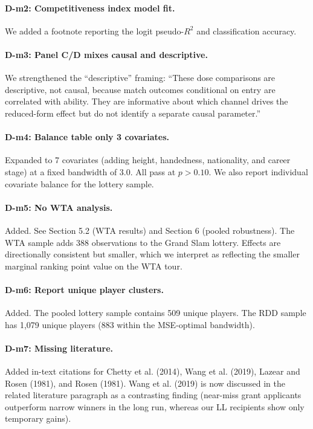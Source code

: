 \documentclass[12pt]{article}
\newcommand{\resp}[1]{\textcolor{response}{#1}}
\begin{document}
\paragraph{D-m2: Competitiveness index model fit.}
\resp{We added a footnote reporting the logit pseudo-$R^2$ and classification accuracy.}

\paragraph{D-m3: Panel C/D mixes causal and descriptive.}
\resp{We strengthened the ``descriptive'' framing: ``These dose comparisons are descriptive, not causal, because match outcomes conditional on entry are correlated with ability. They are informative about which channel drives the reduced-form effect but do not identify a separate causal parameter.''}

\paragraph{D-m4: Balance table only 3 covariates.}
\resp{Expanded to 7 covariates (adding height, handedness, nationality, and career stage) at a fixed bandwidth of 3.0. All pass at $p > 0.10$. We also report individual covariate balance for the lottery sample.}

\paragraph{D-m5: No WTA analysis.}
\resp{Added. See Section 5.2 (WTA results) and Section 6 (pooled robustness). The WTA sample adds 388 observations to the Grand Slam lottery. Effects are directionally consistent but smaller, which we interpret as reflecting the smaller marginal ranking point value on the WTA tour.}

\paragraph{D-m6: Report unique player clusters.}
\resp{Added. The pooled lottery sample contains 509 unique players. The RDD sample has 1,079 unique players (883 within the MSE-optimal bandwidth).}

\paragraph{D-m7: Missing literature.}
\resp{Added in-text citations for Chetty et al. (2014), Wang et al. (2019), Lazear and Rosen (1981), and Rosen (1981). Wang et al. (2019) is now discussed in the related literature paragraph as a contrasting finding (near-miss grant applicants outperform narrow winners in the long run, whereas our LL recipients show only temporary gains).}
\end{document}
